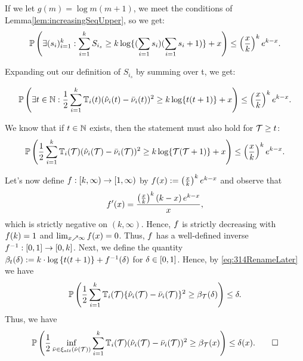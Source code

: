 If we let $g(m) = \log{m(m + 1)}$, we meet the conditions of Lemma\ref{lem:increasingSeqUpper}, so we get:
\begin{align*}
\mathbb{P} \left(\exists (s_i)_{i=1}^{k} : \sum_{i=1}^{k}S_{i_s} \geq k\log
\{{
(\sum_{i=1}s_i)(\sum_{i=1}s_i + 1)
}\}
+ x \right) \leq \left(\frac{x}{k}\right)^k e^{k-x}.
\end{align*}

Expanding out our definition of $S_{i_s}$ by summing over t, we get:

\begin{align*}
\mathbb{P} \left(\exists t \in \mathbb{N} : \frac{1}{2}\sum_{i=1}^{k}\mathbb{T}_{i}(t)(\hat{\nu}_{i}(t) - \bar{\nu}_{i}(t))^2 \geq k\log
\{{
t(t + 1)
}\}
+ x \right) \leq \left(\frac{x}{k}\right)^k e^{k-x}.
\end{align*}

We know that if $t \in \mathbb{N}$ exists, then the statement must also hold for $\mathcal{T} \geq t$:
\begin{align}\label{eq:314RenameLater}
\mathbb{P} \left(\frac{1}{2}\sum_{i=1}^{k} \mathbb{T}_{i}(\mathcal{T})(\hat{\nu}_{i}(\mathcal{T}) - \bar{\nu}_{i}(\mathcal{T}))^2 \geq k\log
\{{
\mathcal{T}(\mathcal{T} + 1)
}\}
+ x \right) \leq \left(\frac{x}{k}\right)^k e^{k-x}.
\end{align}

Let's now define $f:[k,\infty) \rightarrow [1,\infty)$ by $f(x) := \left(\frac{x}{k}\right)^k e^{k-x}$ and observe that 
\begin{align*}
f'(x)=\frac{\left(\frac{x}{k}\right)^{k} \left(k - x\right) e^{k - x}}{x},
\end{align*}
which is strictly negative on $(k,\infty)$. Hence, $f$ is strictly decreasing with $f(k)=1$ and $\lim_{x \nearrow \infty} f(x)=0$. Thus, $f$ has a well-defined inverse $f^{-1}:[0,1] \rightarrow [0,k]$. Next, we define the quantity $\beta_{t}(\delta) := k \cdot \log\left\lbrace t(t+1)\right\rbrace + f^{-1}(\delta)$ for $\delta \in [0,1]$. Hence, by \eqref{eq:314RenameLater} we have
\begin{align}
 \mathbb{P} \left(\frac{1}{2}\sum_{i=1}^{k} \mathbb{T}_{i}(\mathcal{T})\{\hat{\nu}_{i}(\mathcal{T}) - \bar{\nu}_{i}(\mathcal{T})\}^2 \geq \beta_{\mathcal{T}}(\delta) \right) \leq \delta.
\end{align}
Thus, we have
\begin{align*}
\mathbb{P} \left(\frac{1}{2}\inf\limits_{\bar{\nu} \in \xi_{alt}(\hat{\nu}(\mathcal{T}))}\sum_{i=1}^{k} \mathbb{T}_{i}(\mathcal{T})(\hat{\nu}_{i}(\mathcal{T}) - \bar{\nu}_{i}(\mathcal{T}))^2 \geq \beta_{\mathcal{T}}(x) \right) \leq \delta(x). \qed
\end{align*}

